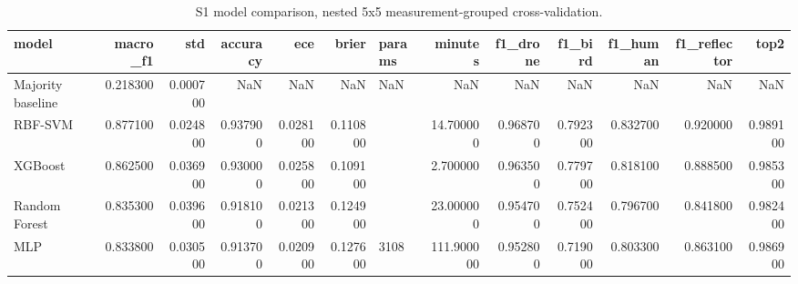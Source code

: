 \begin{table}
\caption{S1 model comparison, nested 5x5 measurement-grouped cross-validation.}
\label{tab:s1_main}
\begin{tabular}{lrrrrrlrrrrrr}
\toprule
model & macro\_f1 & std & accuracy & ece & brier & params & minutes & f1\_drone & f1\_bird & f1\_human & f1\_reflector & top2 \\
\midrule
Majority baseline & 0.218300 & 0.000700 & NaN & NaN & NaN & NaN & NaN & NaN & NaN & NaN & NaN & NaN \\
RBF-SVM & 0.877100 & 0.024800 & 0.937900 & 0.028100 & 0.110800 &  & 14.700000 & 0.968700 & 0.792300 & 0.832700 & 0.920000 & 0.989100 \\
XGBoost & 0.862500 & 0.036900 & 0.930000 & 0.025800 & 0.109100 &  & 2.700000 & 0.963500 & 0.779700 & 0.818100 & 0.888500 & 0.985300 \\
Random Forest & 0.835300 & 0.039600 & 0.918100 & 0.021300 & 0.124900 &  & 23.000000 & 0.954700 & 0.752400 & 0.796700 & 0.841800 & 0.982400 \\
MLP & 0.833800 & 0.030500 & 0.913700 & 0.020900 & 0.127600 & 3108 & 111.900000 & 0.952800 & 0.719000 & 0.803300 & 0.863100 & 0.986900 \\
\bottomrule
\end{tabular}
\end{table}
